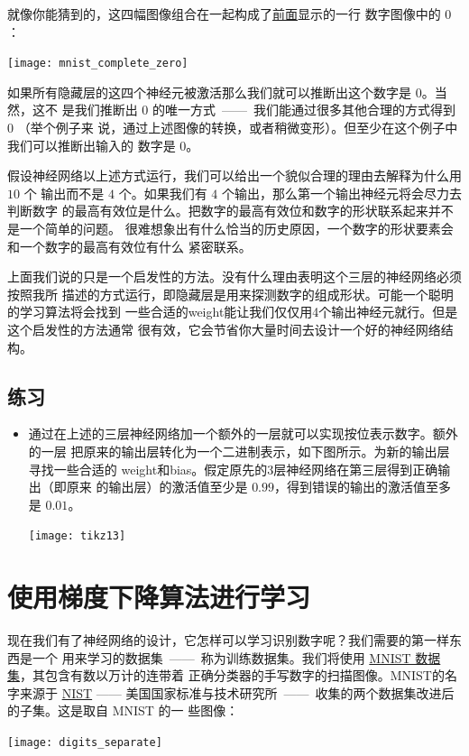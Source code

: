 就像你能猜到的，这四幅图像组合在一起构成了\hyperref[fig:digits]{前面}显示的一行
数字图像中的 $0$：
\begin{center}
  \texttt{[image: mnist\_complete\_zero]}
\end{center}

如果所有隐藏层的这四个神经元被激活那么我们就可以推断出这个数字是 $0$。当然，这不
是我们推断出 $0$ 的唯一方式~——~我们能通过很多其他合理的方式得到 $0$ （举个例子来
  说，通过上述图像的转换，或者稍微变形）。但至少在这个例子中我们可以推断出输入的
数字是 $0$。

假设神经网络以上述方式运行，我们可以给出一个貌似合理的理由去解释为什么用 $10$ 个
输出而不是 $4$ 个。如果我们有 $4$ 个输出，那么第一个输出神经元将会尽力去判断数字
的最高有效位是什么。把数字的最高有效位和数字的形状联系起来并不是一个简单的问题。
很难想象出有什么恰当的历史原因，一个数字的形状要素会和一个数字的最高有效位有什么
紧密联系。

上面我们说的只是一个启发性的方法。没有什么理由表明这个三层的神经网络必须按照我所
描述的方式运行，即隐藏层是用来探测数字的组成形状。可能一个聪明的学习算法将会找到
一些合适的\gls*{weight}能让我们仅仅用4个输出神经元就行。但是这个启发性的方法通常
很有效，它会节省你大量时间去设计一个好的神经网络结构。

\subsection*{练习}

\begin{itemize}
\item 通过在上述的三层神经网络加一个额外的一层就可以实现按位表示数字。额外的一层
  把原来的输出层转化为一个二进制表示，如下图所示。为新的输出层寻找一些合适的%
  \gls*{weight}和\gls*{bias}。假定原先的3层神经网络在第三层得到正确输出（即原来
    的输出层）的激活值至少是 $0.99$，得到错误的输出的激活值至多是 $0.01$。
  \begin{center}
    \texttt{[image: tikz13]}
  \end{center}
\end{itemize}

\section{使用梯度下降算法进行学习}
\label{sec:learning_with_gradient_descent}

现在我们有了神经网络的设计，它怎样可以学习识别数字呢？我们需要的第一样东西是一个
用来学习的数据集~——~称为训练数据集。我们将使用
\href{http://yann.lecun.com/exdb/mnist/}{MNIST 数据集}，其包含有数以万计的连带着
正确分类器的手写数字的扫描图像。MNIST的名字来源于
\href{http://en.wikipedia.org/wiki/National_Institute_of_Standards_and_Technology}{NIST}
—— 美国国家标准与技术研究所~——~收集的两个数据集改进后的子集。这是取自 MNIST 的一
些图像：
\begin{center}
  \texttt{[image: digits\_separate]}
\end{center}

